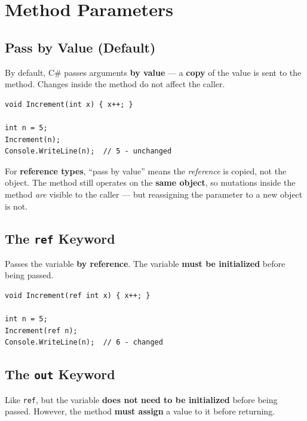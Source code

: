 \documentclass[11pt,a4paper]{article}
\begin{document}
\clearpage
\section{Method Parameters}

\subsection{Pass by Value (Default)}

By default, C\# passes arguments \textbf{by value} — a \textbf{copy} of the value is sent to the method. Changes inside the method do not affect the caller.

\begin{lstlisting}[caption={Pass by value}]
void Increment(int x) { x++; }

int n = 5;
Increment(n);
Console.WriteLine(n);  // 5 - unchanged
\end{lstlisting}

\begin{gotchaBox}
For \textbf{reference types}, ``pass by value'' means the \textit{reference} is copied, not the object. The method still operates on the \textbf{same object}, so mutations inside the method \textit{are} visible to the caller — but reassigning the parameter to a new object is not.
\end{gotchaBox}

\subsection{The \texttt{ref} Keyword}

Passes the variable \textbf{by reference}. The variable \textbf{must be initialized} before being passed.

\begin{lstlisting}[caption={ref parameter}]
void Increment(ref int x) { x++; }

int n = 5;
Increment(ref n);
Console.WriteLine(n);  // 6 - changed
\end{lstlisting}

\subsection{The \texttt{out} Keyword}

Like \texttt{ref}, but the variable \textbf{does not need to be initialized} before being passed. However, the method \textbf{must assign} a value to it before returning.
\end{document}
